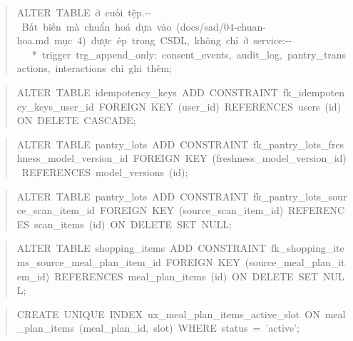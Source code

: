 \begin{quote}\scriptsize\ttfamily\raggedright
ALTER\ TABLE\ ở\ cuối\ tệp.\newline{}-\allowbreak{}-\allowbreak{}\ Bất\ biến\ mà\ chuẩn\ hoá\ dựa\ vào\ (docs/\allowbreak{}sad/\allowbreak{}04-\allowbreak{}chuan-\allowbreak{}hoa.md\ mục\ 4)\ được\ ép\ trong\ CSDL,\ không\ chỉ\ ở\ service:\newline{}-\allowbreak{}-\allowbreak{}\ \ \ *\ trigger\ trg\_\allowbreak{}append\_\allowbreak{}only:\ consent\_\allowbreak{}events,\ audit\_\allowbreak{}log,\ pantry\_\allowbreak{}transactions,\ interactions\ chỉ\ ghi\ thêm;
\end{quote}
\begin{quote}\scriptsize\ttfamily\raggedright
ALTER\ TABLE\ idempotency\_\allowbreak{}keys\ ADD\ CONSTRAINT\ fk\_\allowbreak{}idempotency\_\allowbreak{}keys\_\allowbreak{}user\_\allowbreak{}id\ FOREIGN\ KEY\ (user\_\allowbreak{}id)\ REFERENCES\ users\ (id)\ ON\ DELETE\ CASCADE;
\end{quote}
\begin{quote}\scriptsize\ttfamily\raggedright
ALTER\ TABLE\ pantry\_\allowbreak{}lots\ ADD\ CONSTRAINT\ fk\_\allowbreak{}pantry\_\allowbreak{}lots\_\allowbreak{}freshness\_\allowbreak{}model\_\allowbreak{}version\_\allowbreak{}id\ FOREIGN\ KEY\ (freshness\_\allowbreak{}model\_\allowbreak{}version\_\allowbreak{}id)\ REFERENCES\ model\_\allowbreak{}versions\ (id);
\end{quote}
\begin{quote}\scriptsize\ttfamily\raggedright
ALTER\ TABLE\ pantry\_\allowbreak{}lots\ ADD\ CONSTRAINT\ fk\_\allowbreak{}pantry\_\allowbreak{}lots\_\allowbreak{}source\_\allowbreak{}scan\_\allowbreak{}item\_\allowbreak{}id\ FOREIGN\ KEY\ (source\_\allowbreak{}scan\_\allowbreak{}item\_\allowbreak{}id)\ REFERENCES\ scan\_\allowbreak{}items\ (id)\ ON\ DELETE\ SET\ NULL;
\end{quote}
\begin{quote}\scriptsize\ttfamily\raggedright
ALTER\ TABLE\ shopping\_\allowbreak{}items\ ADD\ CONSTRAINT\ fk\_\allowbreak{}shopping\_\allowbreak{}items\_\allowbreak{}source\_\allowbreak{}meal\_\allowbreak{}plan\_\allowbreak{}item\_\allowbreak{}id\ FOREIGN\ KEY\ (source\_\allowbreak{}meal\_\allowbreak{}plan\_\allowbreak{}item\_\allowbreak{}id)\ REFERENCES\ meal\_\allowbreak{}plan\_\allowbreak{}items\ (id)\ ON\ DELETE\ SET\ NULL;
\end{quote}
\begin{quote}\scriptsize\ttfamily\raggedright
CREATE\ UNIQUE\ INDEX\ ux\_\allowbreak{}meal\_\allowbreak{}plan\_\allowbreak{}items\_\allowbreak{}active\_\allowbreak{}slot\ ON\ meal\_\allowbreak{}plan\_\allowbreak{}items\ (meal\_\allowbreak{}plan\_\allowbreak{}id,\ slot)\ WHERE\ status\ =\ 'active';
\end{quote}
